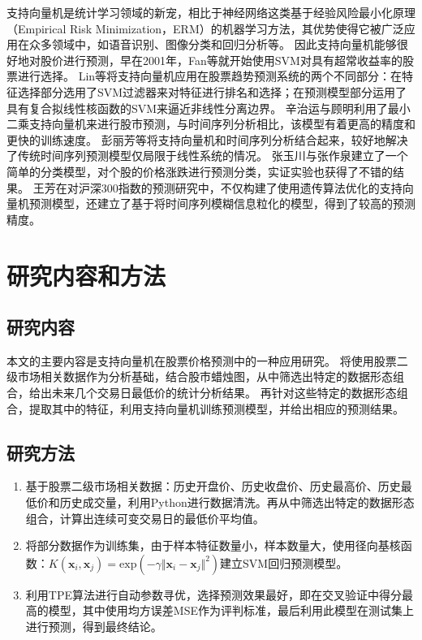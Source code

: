 支持向量机是统计学习领域的新宠，相比于神经网络这类基于经验风险最小化原理（Empirical Risk Minimization，ERM）的机器学习方法，其优势使得它被广泛应用在众多领域中，如语音识别\cite{en4}、图像分类\cite{en5}和回归分析\cite{cn16}等。
因此支持向量机能够很好地对股价进行预测，早在2001年，Fan等就开始使用SVM对具有超常收益率的股票进行选择\cite{en6}。
Lin等将支持向量机应用在股票趋势预测系统的两个不同部分：在特征选择部分选用了SVM过滤器来对特征进行排名和选择；在预测模型部分运用了具有复合拟线性核函数的SVM来逼近非线性分离边界\cite{en7}。
辛治运与顾明利用了最小二乘支持向量机来进行股市预测，与时间序列分析相比，该模型有着更高的精度和更快的训练速度\cite{cn17}。
彭丽芳等将支持向量机和时间序列分析结合起来，较好地解决了传统时间序列预测模型仅局限于线性系统的情况\cite{cn18}。
张玉川与张作泉建立了一个简单的分类模型，对个股的价格涨跌进行预测分类，实证实验也获得了不错的结果\cite{cn19}。
王芳在对沪深300指数的预测研究中，不仅构建了使用遗传算法优化的支持向量机预测模型，还建立了基于将时间序列模糊信息粒化的模型，得到了较高的预测精度\cite{cn20}。

\section{研究内容和方法}

\subsection{研究内容}

本文的主要内容是支持向量机在股票价格预测中的一种应用研究。
将使用股票二级市场相关数据作为分析基础，结合股市蜡烛图，从中筛选出特定的数据形态组合，给出未来几个交易日最低价的统计分析结果。
再针对这些特定的数据形态组合，提取其中的特征，利用支持向量机训练预测模型，并给出相应的预测结果。

\subsection{研究方法}

\begin{enumerate}
    \item 基于股票二级市场相关数据：历史开盘价、历史收盘价、历史最高价、历史最低价和历史成交量，利用Python进行数据清洗。再从中筛选出特定的数据形态组合，计算出连续可变交易日的最低价平均值。
    \item 将部分数据作为训练集，由于样本特征数量小，样本数量大，使用径向基核函数：$K(\mathbf{x}_i,\mathbf{x}_j)=\mathrm{exp}(-\gamma\Vert\mathbf{x}_i-\mathbf{x}_j\Vert^2)$建立SVM回归预测模型。
    \item 利用TPE算法进行自动参数寻优，选择预测效果最好，即在交叉验证中得分最高的模型，其中使用均方误差MSE作为评判标准，最后利用此模型在测试集上进行预测，得到最终结论。
\end{enumerate}
